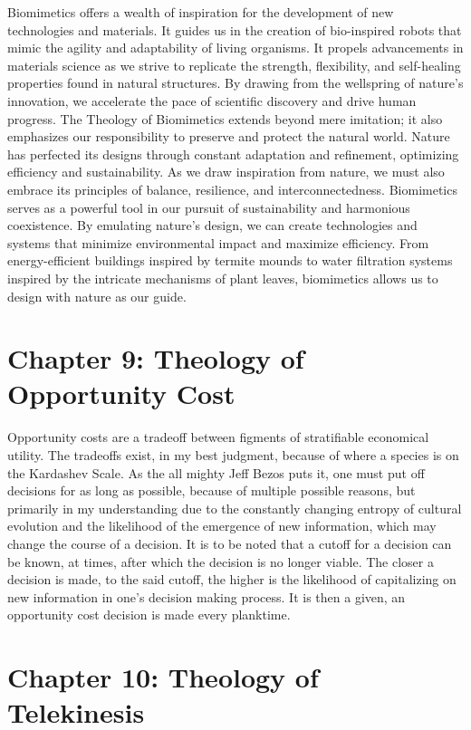 \documentclass[ebook,12pt,oneside,openany]{memoir}
\begin{document}
Biomimetics offers a wealth of inspiration for the development of new technologies and materials. It guides us in the creation of bio-inspired robots that mimic the agility and adaptability of living organisms. It propels advancements in materials science as we strive to replicate the strength, flexibility, and self-healing properties found in natural structures. By drawing from the wellspring of nature's innovation, we accelerate the pace of scientific discovery and drive human progress.
The Theology of Biomimetics extends beyond mere imitation; it also emphasizes our responsibility to preserve and protect the natural world. Nature has perfected its designs through constant adaptation and refinement, optimizing efficiency and sustainability. As we draw inspiration from nature, we must also embrace its principles of balance, resilience, and interconnectedness.
Biomimetics serves as a powerful tool in our pursuit of sustainability and harmonious coexistence. By emulating nature's design, we can create technologies and systems that minimize environmental impact and maximize efficiency. From energy-efficient buildings inspired by termite mounds to water filtration systems inspired by the intricate mechanisms of plant leaves, biomimetics allows us to design with nature as our guide.
\chapter*{Chapter 9: Theology of Opportunity Cost}
Opportunity costs are a tradeoff between figments of stratifiable economical utility. The tradeoffs exist, in my best judgment, because of where a species is on the Kardashev Scale. As the all mighty Jeff Bezos puts it, one must put off decisions for as long as possible, because of multiple possible reasons, but primarily in my understanding due to the constantly changing entropy of cultural evolution and the likelihood of the emergence of new information, which may change the course of a decision. It is to be noted that a cutoff for a decision can be known, at times, after which the decision is no longer viable. The closer a decision is made, to the said cutoff, the higher is the likelihood of capitalizing on new information in one's decision making process.
It is then a given, an opportunity cost decision is made every planktime.
\chapter*{Chapter 10: Theology of Telekinesis}
\vspace*{\fill} %


\vspace*{\fill} %
\end{document}
